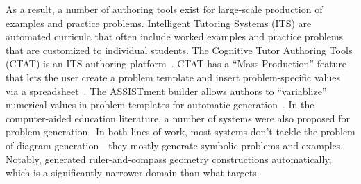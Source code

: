 As a result, a number of authoring tools exist for large-scale production of examples and practice problems. Intelligent Tutoring Systems (ITS) are automated curricula that often include worked examples and practice problems that are customized to individual students. The Cognitive Tutor Authoring Tools (CTAT) is an ITS authoring platform~\cite{CTAT}. CTAT has a ``Mass Production'' feature that lets the user create a problem template and insert problem-specific values via a spreadsheet~\cite{massProduction}. The ASSISTment builder allows authors to ``variablize” numerical values in problem templates for automatic generation~\cite{ASSISTment}. In the computer-aided education literature, a number of systems were also proposed for problem generation~\cite{compEduCACM, synthDeduction, synthGeometry} In both lines of work, most systems don’t tackle the problem of diagram generation—they mostly generate symbolic problems and examples. Notably, \citet{synthGeometry} generated ruler-and-compass geometry constructions automatically, which is a significantly narrower domain than what \Edgeworth targets. 